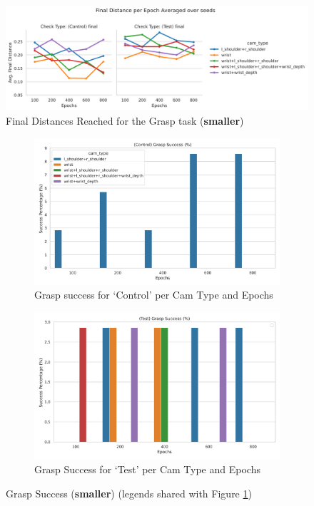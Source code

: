 \begin{figure}[H]
  \centering
  \includegraphics[width=\linewidth]{assets/evaluation/baseline/base-grasp-final-smaller.png}
  \caption{Final Distances Reached for the Grasp task (\textbf{smaller})}\label{fig:base-grasp-final-smaller}
\end{figure}

\begin{figure}[H]
  \centering
  \begin{subfigure}{0.45\linewidth}
    \centering
    \includegraphics[width=0.7\linewidth]{assets/evaluation/baseline/base-smaller-grasp-control-success-cams-epochs.png}
    \caption{Grasp success for `Control' per Cam Type and Epochs }\label{subfig:base-grasp-control-success-smaller}
  \end{subfigure}
  \hfill
  \begin{subfigure}{0.45\linewidth}
    \centering
    \includegraphics[width=0.7\linewidth]{assets/evaluation/baseline/base-smaller-grasp-test-success-cams-epochs.png}
    \caption{Grasp Success for `Test' per Cam Type and Epochs}\label{subfig:base-grasp-test-success-smaller}
  \end{subfigure}
  
  \caption{Grasp Success (\textbf{smaller}) (legends shared with Figure \ref{fig:base-grasp-final-smaller})}\label{fig:base-grasp-success-smaller}
\end{figure}

